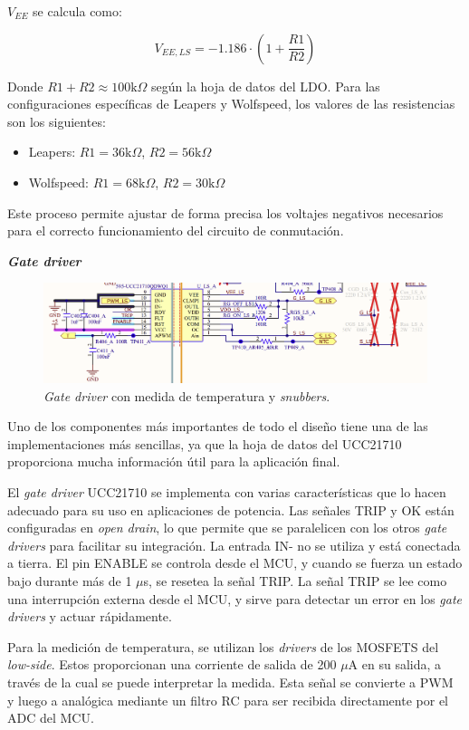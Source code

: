 $V_{EE}$ se calcula como:

\[ V_{EE,LS} = -1.186 \cdot \left(1 + \frac{R1}{R2}\right) \]

Donde \( R1 + R2 \approx 100 \text{k}\Omega \) según la hoja de datos del LDO. Para las configuraciones específicas de Leapers y Wolfspeed, los valores de las resistencias son los siguientes:

\begin{itemize}
	\item Leapers: \( R1 = 36 \text{k}\Omega \), \( R2 = 56 \text{k}\Omega \)
	\item Wolfspeed: \( R1 = 68 \text{k}\Omega \), \( R2 = 30 \text{k}\Omega \)
\end{itemize}

Este proceso permite ajustar de forma precisa los voltajes negativos necesarios para el correcto funcionamiento del circuito de conmutación.


\textbf{\textit{Gate driver}}
\begin{figure}[H]
	\centering
	\includegraphics[width=0.9\linewidth]{fig/GD-sch}
	\caption{\textit{Gate driver} con medida de temperatura y \textit{snubbers}.}
\end{figure}

Uno de los componentes más importantes de todo el diseño tiene una de las implementaciones más sencillas, ya que la hoja de datos del UCC21710 proporciona mucha información útil para la aplicación final.

El \textit{gate driver} UCC21710 se implementa con varias características que lo hacen adecuado para su uso en aplicaciones de potencia. Las señales TRIP y OK están configuradas en \textit{open drain}, lo que permite que se paralelicen con los otros \textit{gate drivers} para facilitar su integración. La entrada IN- no se utiliza y está conectada a tierra. El pin ENABLE se controla desde el MCU, y cuando se fuerza un estado bajo durante más de 1 $\mu$s, se resetea la señal TRIP. La señal TRIP se lee como una interrupción externa desde el MCU, y sirve para detectar un error en los \textit{gate drivers} y actuar rápidamente.

Para la medición de temperatura, se utilizan los \textit{drivers} de los MOSFETS del \textit{low-side}. Estos proporcionan una corriente de salida de 200 $\mu$A en su salida, a través de la cual se puede interpretar la medida. Esta señal se convierte a PWM y luego a analógica mediante un filtro RC para ser recibida directamente por el ADC del MCU. 

